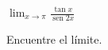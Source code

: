 \item $\displaystyle \lim_{x \to \pi} \frac{\tan x}{\operatorname{sen} 2x}$
\par
Encuentre el límite.
